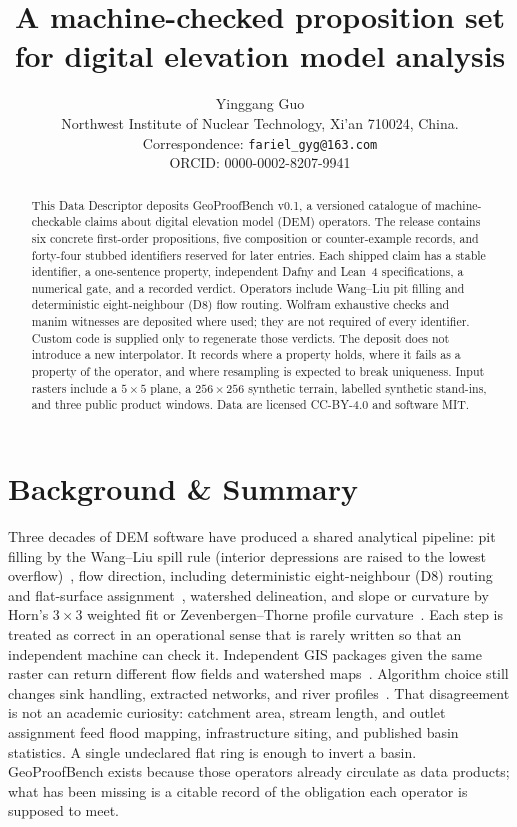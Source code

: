 \documentclass[11pt,a4paper]{article}
\title{A machine-checked proposition set for digital elevation model analysis}
\author{Yinggang Guo\\[0.4em]
\small Northwest Institute of Nuclear Technology, Xi'an 710024, China.\\
\small Correspondence: \mbox{\texttt{fariel\_gyg@163.com}}\\
\small ORCID: 0000-0002-8207-9941}
\date{}
\begin{document}
\maketitle

\begin{abstract}
This Data Descriptor deposits GeoProofBench v0.1, a \mbox{versioned} catalogue of
machine-checkable claims about digital elevation model (DEM) operators.
The release contains six concrete first-order propositions, five composition
or counter-example records, and forty-four stubbed identifiers reserved for
later entries. Each shipped claim has a stable identifier, a one-sentence
property, independent Dafny and Lean~4 specifications, a numerical gate, and
a recorded verdict. Operators include Wang--Liu pit filling and
deterministic eight-neighbour (D8) flow routing. Wolfram exhaustive checks and manim witnesses are
deposited where used; they are not required of every identifier. Custom code
is supplied only to regenerate those verdicts. The
deposit does not introduce a new interpolator. It records where a property
holds, where it fails as a property of the operator, and where resampling
is expected to break uniqueness. Input rasters include a $5\times5$ plane,
a $256\times256$ synthetic terrain, labelled synthetic stand-ins, and three
public product windows. Data are licensed CC-BY-4.0 and software MIT.
\end{abstract}

\section{Background \& Summary}

Three decades of DEM software have produced a shared analytical pipeline:
pit filling by the Wang--Liu spill rule (interior depressions are raised
to the lowest overflow)~\cite{wang2006}, flow direction, including
deterministic eight-neighbour (D8) routing~\cite{ocallaghan1984} and
flat-surface assignment~\cite{garbrecht1997}, watershed delineation, and
slope or curvature by Horn's $3\times3$ weighted fit or
Zevenbergen--Thorne profile curvature~\cite{horn1981,zevenbergen1987}. Each step is treated as correct
in an operational sense that is rarely written so that an independent
machine can check it. Independent GIS packages given the same raster can
return different flow fields and watershed maps~\cite{zhou2004}.
Algorithm choice still changes sink handling, extracted networks, and
river profiles~\cite{lindsay2016,schwanghart2017,clubb2017}. That
disagreement is not an academic curiosity: catchment area, stream length,
and outlet assignment feed flood mapping, infrastructure siting, and
published basin statistics. A single undeclared flat ring is enough to
invert a basin. GeoProofBench exists because those operators already
circulate as data products; what has been missing is a citable record of
the obligation each operator is supposed to meet.
\end{document}
